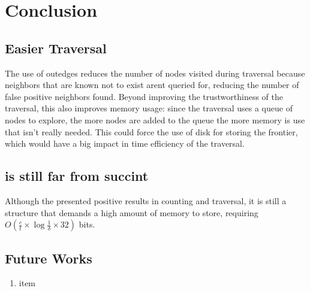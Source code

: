 \chapter{Conclusion}

\section{Easier Traversal}

The use of outedges reduces the number of nodes visited during traversal because neighbors that are known not to exist arent queried for, reducing the number of false positive neighbors found. Beyond improving the trustworthiness of the traversal, this also improves memory usage: since the traversal uses a queue of nodes to explore, the more nodes are added to the queue the more memory is use that isn't really needed. This could force the use of disk for storing the frontier, which would have a big impact in time efficiency of the traversal.

\section{\dBCM is still far from succint}

Although the \dBCM presented positive results in counting and traversal, it is still a structure that demands a high amount of memory to store, requiring $O(\frac{c}{t} \times \log \frac{1}{\delta} \times 32)$ bits.

\section{Future Works}

\begin{enumerate}
\item item
\end{enumerate}